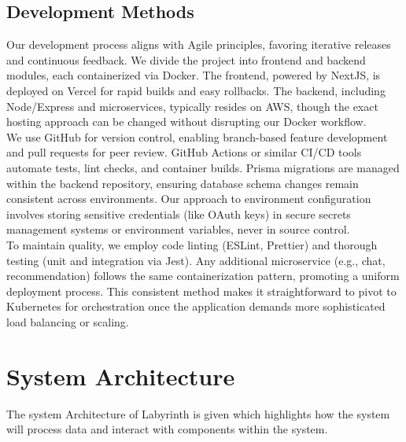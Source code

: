 \documentclass{FastFyp}
\begin{document}
\subsection{Development Methods}
Our development process aligns with Agile principles, favoring iterative releases and continuous feedback. We divide the project into frontend and backend modules, each containerized via Docker. The frontend, powered by NextJS, is deployed on Vercel for rapid builds and easy rollbacks. The backend, including Node/Express and microservices, typically resides on AWS, though the exact hosting approach can be changed without disrupting our Docker workflow. \\
We use GitHub for version control, enabling branch-based feature development and pull requests for peer review. GitHub Actions or similar CI/CD tools automate tests, lint checks, and container builds. Prisma migrations are managed within the backend repository, ensuring database schema changes remain consistent across environments. Our approach to environment configuration involves storing sensitive credentials (like OAuth keys) in secure secrets management systems or environment variables, never in source control. \\
To maintain quality, we employ code linting (ESLint, Prettier) and thorough testing (unit and integration via Jest). Any additional microservice (e.g., chat, recommendation) follows the same containerization pattern, promoting a uniform deployment process. This consistent method makes it straightforward to pivot to Kubernetes for orchestration once the application demands more sophisticated load balancing or scaling.


\section{System Architecture}
The system Architecture of Labyrinth is given which highlights how the system will process data and
interact with components within the system.
\end{document}
